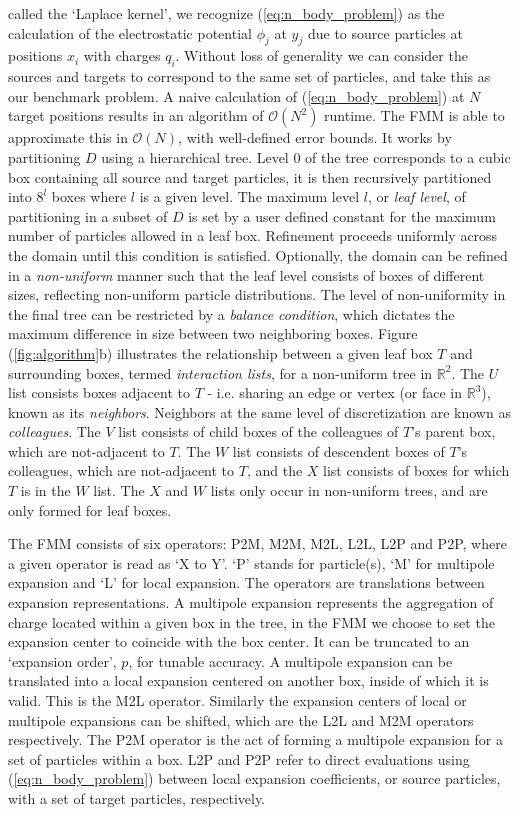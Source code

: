 \documentclass{IEEEcsmag}
\begin{document}
called the `Laplace kernel', we recognize (\ref{eq:n_body_problem}) as the calculation of the electrostatic potential $\phi_j$ at $y_j$ due to source particles at positions $x_i$ with charges $q_i$. Without loss of generality we can consider the sources and targets to correspond to the same set of particles, and take this as our benchmark problem. A naive calculation of (\ref{eq:n_body_problem}) at $N$ target positions results in an algorithm of $\mathcal{O}(N^2)$ runtime. The FMM is able to approximate this in $\mathcal{O}(N)$, with well-defined error bounds. It works by partitioning $D$ using a hierarchical tree. Level $0$ of the tree corresponds to a cubic box containing all source and target particles, it is then recursively partitioned into $8^l$ boxes where $l$ is a given level. The maximum level $l$, or \textit{leaf level}, of partitioning in a subset of $D$ is set by a user defined constant for the maximum number of particles allowed in a leaf box. Refinement proceeds uniformly across the domain until this condition is satisfied. Optionally, the domain can be refined in a \textit{non-uniform} manner such that the leaf level consists of boxes of different sizes, reflecting non-uniform particle distributions. The level of non-uniformity in the final tree can be restricted by a \textit{balance condition}, which dictates the maximum difference in size between two neighboring boxes. Figure (\ref{fig:algorithm}b) illustrates the relationship between a given leaf box $T$ and surrounding boxes, termed \textit{interaction lists}, for a non-uniform tree in $\mathbb{R}^2$. The $U$ list consists boxes adjacent to $T$ - i.e. sharing an edge or vertex (or face in $\mathbb{R}^3$), known as its \textit{neighbors}. Neighbors at the same level of discretization are known as \textit{colleagues}.  The $V$ list consists of child boxes of the colleagues of $T$'s parent box, which are not-adjacent to $T$. The $W$ list consists of descendent boxes of $T$'s colleagues, which are not-adjacent to $T$, and the $X$ list consists of boxes for which $T$ is in the $W$ list. The $X$ and $W$ lists only occur in non-uniform trees, and are only formed for leaf boxes.

The FMM consists of six operators: P2M, M2M, M2L, L2L, L2P and P2P, where a given operator is read as `X to Y'. `P' stands for particle(s), `M' for multipole expansion and `L' for local expansion. The operators are translations between expansion representations. A multipole expansion represents the aggregation of charge located within a given box in the tree, in the FMM we choose to set the expansion center to coincide with the box center. It can be truncated to an `expansion order', $p$, for tunable accuracy. A multipole expansion can be translated into a local expansion centered on another box, inside of which it is valid. This is the M2L operator. Similarly the expansion centers of local or multipole expansions can be shifted, which are the L2L and M2M operators respectively. The P2M operator is the act of forming a multipole expansion for a set of particles within a box. L2P and P2P refer to direct evaluations using (\ref{eq:n_body_problem}) between local expansion coefficients, or source particles, with a set of target particles, respectively.
\end{document}
